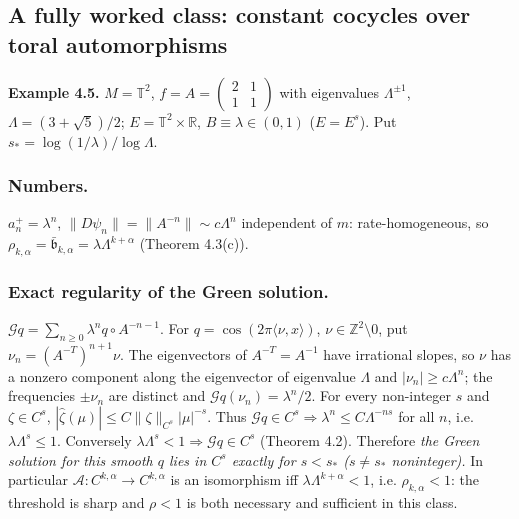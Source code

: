 \documentclass[11pt,a4paper]{article}
\theoremstyle{plain}
\theoremstyle{definition}
\theoremstyle{remark}
\numberwithin{equation}{section}
\numberwithin{figure}{section}
\begin{document}
\subsection{A fully worked class: constant cocycles over toral automorphisms}

\textbf{Example 4.5.} $M=\mathbb T^2$, $f=A=\begin{pmatrix}2&1\\1&1\end{pmatrix}$ with eigenvalues $\Lambda^{\pm1}$, $\Lambda=(3+\sqrt5)/2$; $E=\mathbb T^2\times\mathbb R$, $B\equiv\lambda\in(0,1)$ ($E=E^s$). Put $s_*=\log(1/\lambda)/\log\Lambda$.

\subsubsection{Numbers.} $a^+_n=\lambda^n$, $\|D\psi_n\|=\|A^{-n}\|\sim c\Lambda^n$ independent of $m$: rate-homogeneous, so $\rho_{k,\alpha}=\bar{\mathfrak b}_{k,\alpha}=\lambda\Lambda^{k+\alpha}$ (Theorem 4.3(c)).

\subsubsection{Exact regularity of the Green solution.} $\mathcal Gq=\sum_{n\ge0}\lambda^nq\circ A^{-n-1}$. For $q=\cos(2\pi\langle\nu,x\rangle)$, $\nu\in\mathbb Z^2\setminus0$, put $\nu_n=(A^{-T})^{n+1}\nu$. The eigenvectors of $A^{-T}=A^{-1}$ have irrational slopes, so $\nu$ has a nonzero component along the eigenvector of eigenvalue $\Lambda$ and $|\nu_n|\ge c\Lambda^n$; the frequencies $\pm\nu_n$ are distinct and $\widehat{\mathcal Gq}(\nu_n)=\lambda^n/2$. For every non-integer $s$ and $\zeta\in C^s$, $|\hat\zeta(\mu)|\le C\|\zeta\|_{C^s}|\mu|^{-s}$. Thus $\mathcal Gq\in C^s\Rightarrow\lambda^n\le C\Lambda^{-ns}$ for all $n$, i.e. $\lambda\Lambda^s\le1$. Conversely $\lambda\Lambda^s<1\Rightarrow\mathcal Gq\in C^s$ (Theorem 4.2). Therefore \textit{the Green solution for this smooth $q$ lies in $C^s$ exactly for $s<s_*$ ($s\ne s_*$ noninteger).} In particular $\mathcal A:C^{k,\alpha}\to C^{k,\alpha}$ is an isomorphism iff $\lambda\Lambda^{k+\alpha}<1$, i.e. $\rho_{k,\alpha}<1$: the threshold is sharp and $\rho<1$ is both necessary and sufficient in this class.
\end{document}
